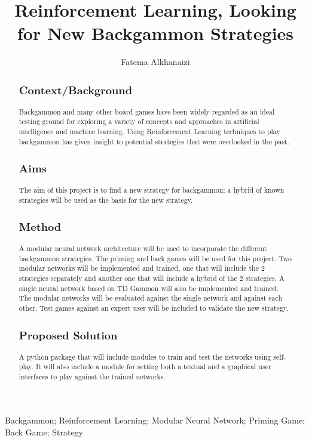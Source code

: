 \documentclass[12pt,a4paper]{article}
\title{Reinforcement Learning, Looking for New Backgammon Strategies}
\author{Fatema Alkhanaizi}
\date{}
\begin{document}
\maketitle

\begin{abstract}
\subsection{Context/Background}
Backgammon and many other board games have been widely regarded as an ideal testing ground for exploring a variety of concepts and approaches in artificial intelligence and machine learning. Using Reinforcement Learning techniques to play backgammon has given insight to potential strategies that were overlooked in the past.
\subsection{Aims}
The aim of this project is to find a new strategy for backgammon; a hybrid of known strategies will be used as the basis for the new strategy. 
\subsection{Method}
A modular neural network architecture will be used to incorporate the different backgammon strategies. The priming and back games will be used for this project. Two modular networks will be implemented and trained, one that will include the 2 strategies separately and another one that will include a hybrid of the 2 strategies. A single neural network based on TD Gammon will also be implemented and trained. The modular networks will be evaluated against the single network and against each other. Test games against an expert user will be included to validate the new strategy.
\subsection{Proposed Solution}
A python package that will include modules to train and test the networks using self-play. It will also include a module for setting both a textual and a graphical user interfaces to play against the trained networks. 
\end{abstract}

\begin{keywords}
Backgammon; Reinforcement Learning; Modular Neural Network; Priming Game; Back Game; Strategy
\end{keywords}
\end{document}
